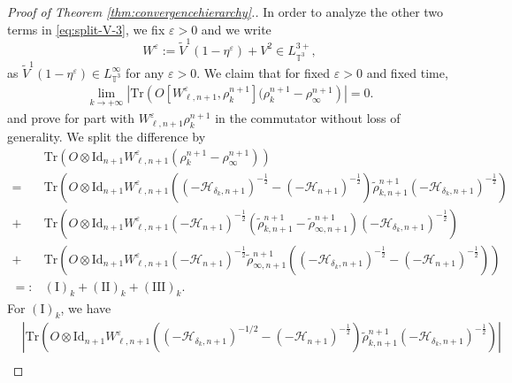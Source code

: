\begin{proof}[Proof of Theorem \ref{thm:convergencehierarchy}.]
  In order to analyze the other two terms in \eqref{eq:split-V-3}, we fix
  $\varepsilon > 0$ and we write
  \[ 
  W^{\varepsilon} := \tilde{V}^1 (1 - \eta^{\varepsilon}) + V^2 \in L^{3 +}_{\mathbb{T}^3},
  \]
  as $\tilde{V}^1 (1 - \eta^{\varepsilon}) \in
  L^{\infty}_{\mathbb{T}^3}$ for any $\varepsilon > 0$. We claim that for fixed $\varepsilon > 0$ and fixed time, 
  \begin{align}
    \lim_{k \rightarrow + \infty} \left| \mathrm{Tr} \left(O [W^{\varepsilon}_{\ell, n + 1}, \rho^{n + 1}_k] (\rho^{n + 1}_k - \rho^{n + 1}_{\infty}\right)
    \right| = 0. \label{eq:limitconvergence4}
  \end{align}
and prove for part with $W^{\varepsilon}_{\ell, n + 1}\rho^{n + 1}_k$ in the commutator without loss of generality. We split the difference by
  \begin{align}
    & \mathrm{Tr} \left(O \otimes \mathrm{Id}_{n + 1}
    W^{\varepsilon}_{\ell, n + 1} (\rho^{n + 1}_k - \rho^{n + 1}_{\infty})\right)
    \nonumber\\
     = & \mathrm{Tr} \left(O \otimes \mathrm{Id}_{n + 1}
    W^{\varepsilon}_{\ell, n + 1} \left((- \mathcal{H}_{\delta_k, n+1})^{-\frac{1}{2}} - (- \mathcal{H}_{n+1})^{- \frac{1}{2}}\right) \tilde{\rho}^{n + 1}_{k, n +
    1} (- \mathcal{H}_{\delta_k, n+1})^{- \frac{1}{2}}\right) \nonumber\\
    +& \mathrm{Tr} \left(O \otimes \mathrm{Id}_{n + 1}
    W^{\varepsilon}_{\ell, n + 1} (- \mathcal{H}_{n+1})^{- \frac{1}{2}}
    \left(\tilde{\rho}^{n + 1}_{k, n + 1} - \tilde{\rho}^{n + 1}_{\infty, n + 1}\right)
    (- \mathcal{H}_{\delta_k, n+1})^{- \frac{1}{2}}\right) \nonumber\\
     + & \mathrm{Tr} \left(O \otimes \mathrm{Id}_{n + 1}
    W^{\varepsilon}_{\ell, n + 1} (- \mathcal{H}_{n+1})^{- \frac{1}{2}}
    \tilde{\rho}^{n + 1}_{\infty, n + 1} \left( (- \mathcal{H}_{\delta_k,
    n+1})^{- \frac{1}{2}} - (- \mathcal{H}_{n+1})^{- \frac{1}{2}}\right)\right)
    \nonumber\\
     =: & (\mathrm{I})_k + (\mathrm{I} \mathrm{I})_k + (\mathrm{I} \mathrm{I} \mathrm{I})_k . 
    \label{eq:split-Tr-KVepsilon}
  \end{align}
  For $(\mathrm{I})_k$, we have
  \begin{align*}
    &  \left| \mathrm{Tr} \left(O \otimes \mathrm{Id}_{n + 1}
    W^{\varepsilon}_{\ell, n + 1} \left((- \mathcal{H}_{\delta_k, n+1})^{- 1
    / 2} - (- \mathcal{H}_{n+1})^{- \frac{1}{2}}\right) \tilde{\rho}^{n + 1}_{k, n +
    1} (- \mathcal{H}_{\delta_k, n+1})^{- \frac{1}{2}}\right) \right|\\

\end{align*}
\end{proof}
